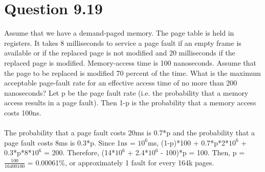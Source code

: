 \documentclass[12pt]{article}
\begin{document}
\section*{Question 9.19}{\color{blue}Assume that we have a demand-paged memory. The page table is held in registers. It takes 8 milliseconds to service a page fault if an empty frame is available or if the replaced page is not modified and 20 milliseconds if the replaced page is modified. Memory-access time is 100 nanoseconds. Assume that the page to be replaced is modified 70 percent of the time. What is the maximum acceptable page-fault rate for an effective access time of no more than 200 nanoseconds?} Let p be the page fault rate (i.e. the probability that a memory access results in a page fault). Then 1-p is the probability that a memory access costs 100ns. 
\\ \\
The probability that a page fault costs 20ms is 0.7*p and the probability that a page fault costs 8ms is 0.3*p. Since 1ns = $10^{6}$ms, (1-p)*100 + 0.7*p*2*$10^{6}$ + 0.3*p*8*$10^{6}$ = 200. Therefore, (14*$10^{6}$ + 2.4*$10^{6}$ - 100)*p = 100. Then, p = $\frac{100}{16400100}$ = 0.00061\%, or approximately 1 fault for every 164k pages.
\end{document}
